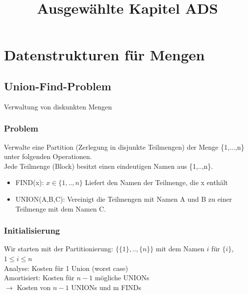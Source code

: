 \documentclass[a4paper]{article}
\begin{document}
\title{Ausgewählte Kapitel ADS}
\maketitle
\section{Datenstrukturen für Mengen}
\subsection{Union-Find-Problem}
Verwaltung von diskunkten Mengen\\
\subsubsection*{Problem}
Verwalte eine Partition (Zerlegung in disjunkte Teilmengen) der Menge \{1,...,n\} unter folgenden Operationen.\\
Jede Teilmenge (Block) besitzt einen eindeutigen Namen aus \{1,..,n\}.
\begin{itemize}
\item FIND(x): $x\in \{1,..,n\}$ Liefert den Namen der Teilmenge, die x enthält
\item UNION(A,B,C): Vereinigt die Teilmengen mit Namen A und B zu einer Teilmenge mit dem Namen C.
\end{itemize}
\subsubsection*{Initialisierung}
Wir starten mit der Partitionierung: $\{\{1\},..,\{n\}\}$ mit dem Namen $i$ für $\{i\}$,$1\leq i \leq n$\\
Analyse: Kosten für 1 Union (worst case)\\
Amortisiert: Kosten für $n-1$ mögliche UNIONs\\
$\rightarrow$ Kosten von $n-1$ UNIONs und m FINDs\\
\end{document}
